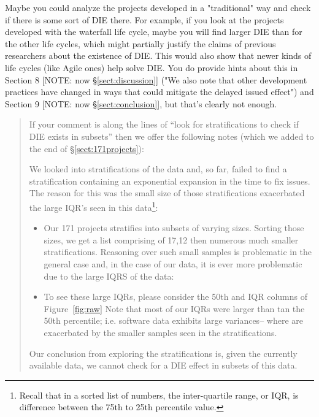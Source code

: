 \documentclass[smallcondensed]{svjour3}
\newcommand{\bi}{\begin{itemize}}%
\newcommand{\ei}{\end{itemize}}
\newcommand{\tion}[1]{\S\ref{sect:#1}}
\begin{document}
Maybe you could analyze the projects developed in a
"traditional" way and check if there is some sort of DIE
there. For example, if you look at the projects developed
with the waterfall life cycle, maybe you will find larger
DIE than for the other life cycles, which might partially
justify the claims of previous researchers about the
existence of DIE. This would also show that newer kinds of
life cycles (like Agile ones) help solve DIE. You do provide
hints about this in Section 8 [NOTE: now \tion{discussion}] ("We also note that other
development practices have changed in ways that could
mitigate the delayed issued effect") and Section 9 [NOTE: now \tion{conclusion}], but
that's clearly not enough.
\begin{quote}{\em

If your comment is along the lines of ``look for stratifications to check if
DIE exists in subsets'' then we offer the following notes (which we added to the end of \tion{171projects}):

We looked into   stratifications of the data and, so far,   failed to find a stratification
containing an exponential expansion in the time to fix issues. The reason for this was  the small size
of those stratifications  exacerbated the large IQR's seen in this data\footnote{Recall that in a sorted list of numbers,
the inter-quartile range, or IQR, is difference between the 
  75th to 25th percentile value.}:
\bi
\item
Our 171 projects   stratifies into subsets of varying sizes. Sorting those sizes, we get a list
comprising of 17,12 then numerous much smaller stratifications.  Reasoning over such small samples
is problematic in the general case and, in the case of our data, it is ever more problematic due to
the large IQRS of the data:
\item
To see these large IQRs,  please consider the 50th and IQR columns of Figure~\ref{fig:raw} Note that most of our IQRs were larger than tan the 50th percentile; i.e. software
data exhibits large variances-- where are exacerbated by the smaller samples seen in the stratifications.
\ei
Our conclusion from exploring the stratifications is, given the currently available data, we cannot check
for a DIE effect in subsets of this data.
}
\end{quote}
\end{document}
